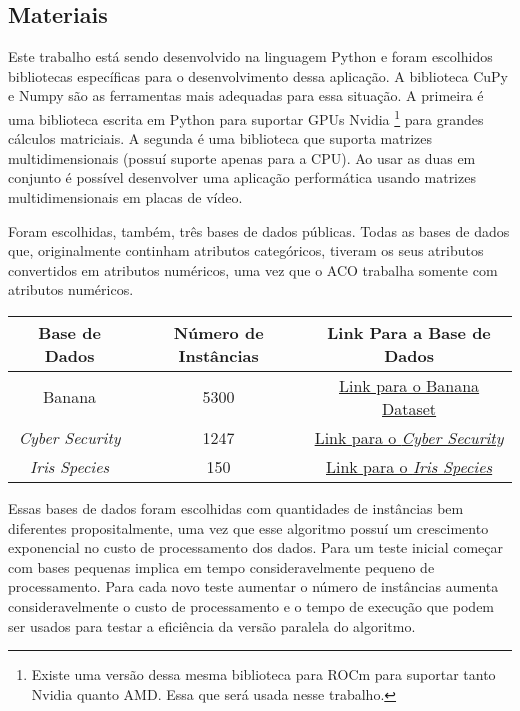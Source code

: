 \subsection{Materiais} \label{Materiais}

Este trabalho está sendo desenvolvido na linguagem Python e foram escolhidos bibliotecas
específicas para o desenvolvimento dessa aplicação.
A biblioteca CuPy\cite{cupyLib} e Numpy\cite{numpyLib} são as ferramentas mais adequadas
para essa situação. A primeira é uma biblioteca escrita em Python para suportar GPUs Nvidia
\footnote[1]{Existe uma versão dessa mesma biblioteca para ROCm para suportar tanto Nvidia quanto AMD. Essa que será usada nesse trabalho.}
para grandes cálculos matriciais. A segunda é uma biblioteca que suporta matrizes multidimensionais
(possuí suporte apenas para a CPU). Ao usar as duas em conjunto é possível desenvolver uma aplicação
performática usando matrizes multidimensionais em placas de vídeo.

Foram escolhidas, também, três bases de dados públicas.
Todas as bases de dados que, originalmente continham atributos categóricos, tiveram os
seus atributos convertidos em atributos numéricos, uma vez que o ACO trabalha
somente com atributos numéricos.

\begin{center}
    \begin{tabular}{|c|c|c|}
        \hline
        Base de Dados & Número de Instâncias & Link Para a Base de Dados \\
        \hline
        Banana & 5300 & \href{https://www.kaggle.com/datasets/saranchandar/standard-classification-banana-dataset}{Link para o Banana Dataset} \\
        \hline
        \emph{Cyber Security} & 1247 & \href{https://www.kaggle.com/datasets/deepcontractor/cyber-security-salaries}{Link para o \emph{Cyber Security}} \\
        \hline
        \emph{Iris Species} & 150 & \href{https://www.kaggle.com/datasets/uciml/iris}{Link para o \emph{Iris Species}} \\
        \hline
    \end{tabular}
\end{center}

Essas bases de dados foram escolhidas com quantidades de instâncias bem diferentes propositalmente, uma vez
que esse algoritmo possuí um crescimento exponencial no custo de processamento dos dados. Para um teste inicial
começar com bases pequenas implica em tempo consideravelmente pequeno de processamento. Para cada novo teste
aumentar o número de instâncias aumenta consideravelmente o custo de processamento e o tempo de execução que
podem ser usados para testar a eficiência da versão paralela do algoritmo.

